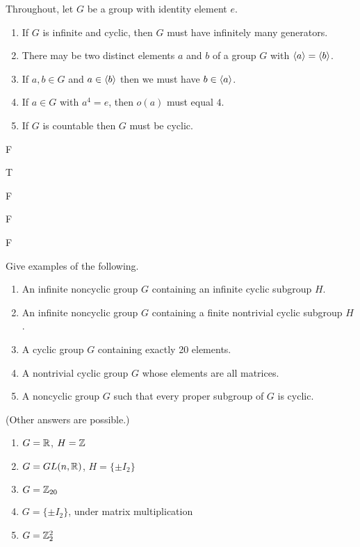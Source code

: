 \begin{exercise}
\tf Throughout, let $G$ be a group with identity element $e$.

\begin{enumerate}
\item If $G$ is infinite and cyclic, then $G$ must have infinitely many generators.
\item There may be two distinct elements $a$ and $b$ of a group $G$ with $\langle a\rangle=\langle b\rangle$.
\item If $a,b\in G$ and $a\in \langle b\rangle$ then we must have $b\in \langle a\rangle$.
\item If $a\in G$ with $a^4=e$, then $o(a)$ must equal $4$.
\item If $G$ is countable then $G$ must be cyclic.
\end{enumerate}
\end{exercise}

\begin{solution}[print=true]

\begin{inparaenum}[(a)]
\item F \hfill \item T \hfill \item  F \hfill \item F \hfill \item F
\end{inparaenum}

\end{solution}


\begin{exercise}
Give examples of the following.

\begin{enumerate}
\item An infinite noncyclic group $G$ containing an infinite cyclic subgroup $H$.
\item An infinite noncyclic group $G$ containing a finite nontrivial cyclic subgroup $H$.
\item A cyclic group $G$ containing exactly 20 elements.
\item A nontrivial cyclic group $G$ whose elements are all matrices.
\item A noncyclic group $G$ such that every proper subgroup of $G$ is cyclic.
\end{enumerate}
\end{exercise}

\begin{solution}[print=true]
(Other answers are possible.)

\begin{enumerate}
\item $G=\mathbb{R}$, $H=\mathbb{Z}$ \quad
\item $G=GL(n,\mathbb{R})$, $H=\{\pm I_2\}$
\item $G=\mathbb{Z}_{20}$
\item $G=\{\pm I_2\}$, under matrix multiplication
\item $G=\mathbb{Z}_2^2$
\end{enumerate}
\end{solution}


